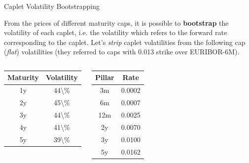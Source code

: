 \documentclass{beamer}
\begin{document}
\begin{frame}{Caplet Volatility Bootstrapping}

From the prices of different maturity caps, it is possible to \textbf{bootstrap} the volatility of each caplet, i.e. the volatility which refers to the forward rate corresponding to the caplet.
Let's \emph{strip} caplet volatilities from the following cap (\emph{flat}) volatilities (they referred to caps with 0.013 strike over EURIBOR-6M).
\begin{columns}
	\begin{center}
\begin{tabular}{|c|c|}
	\hline
	Maturity & Volatility \\
	\hline
	1y & 44\textbackslash{}\% \\
	\hline
	2y & 45\textbackslash{}\% \\
	\hline
	3y & 44\textbackslash{}\% \\
	\hline
	4y & 41\textbackslash{}\% \\
	\hline
	5y & 39\textbackslash{}\% \\
	\hline
\end{tabular}
\end{center}
\begin{center}
\begin{tabular}{|c|c|}
	\hline
	Pillar & Rate \\
	\hline
	3m & 0.0002 \\
	\hline
	6m & 0.0007 \\
	\hline
	12m & 0.0025 \\
	\hline
	2y & 0.0070 \\
	\hline
	3y & 0.0100 \\
	\hline
	5y & 0.0162 \\
	\hline
\end{tabular}
\end{center}
\end{columns}
\end{frame}
\end{document}
